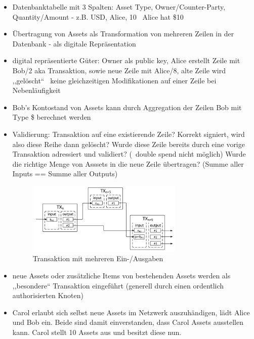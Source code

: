         \begin{itemize}
            \item Datenbanktabelle mit 3 Spalten: Asset Type, Owner/Counter-Party, Quantity/Amount - z.B. USD, Alice, 10 \textrightarrow\ Alice hat \$10
            \item Übertragung von Assets als Transformation von mehreren Zeilen in der Datenbank - als digitale Repräsentation
            \item digital repräsentierte Güter: Owner als public key, Alice erstellt Zeile mit Bob/2 aka Transaktion, sowie neue Zeile mit Alice/8, alte Zeile wird ,,gelöscht`` \textrightarrow\ keine gleichzeitigen Modifikationen auf einer Zeile bei Nebenläufigkeit
            \item Bob's Kontostand von Assets kann durch Aggregation der Zeilen Bob mit Type \$ berechnet werden
            \item Validierung: Transaktion auf eine existierende Zeile? Korrekt signiert, wird also diese Reihe dann gelöscht? Wurde diese Zeile bereits durch eine vorige Transaktion adressiert und validiert? (\textrightarrow\ double spend nicht möglich) Wurde die richtige Menge von Asssets in die neue Zeile übertragen? (Summe aller Inputs == Summe aller Outputs)
            \begin{figure}[H]
                \centering
                \includegraphics[width=0.7\textwidth]{paperNotes/chrisitidis201601.PNG}
                \caption{Transaktion mit mehreren Ein-/Ausgaben}
                \label{figure:txio}
            \end{figure}
            \item neue Assets oder zusätzliche Items von bestehenden Assets werden als ,,besondere`` Transaktion eingeführt (generell durch einen ordentlich authorisierten Knoten)
            \item Carol erlaubt sich selbst neue Assets im Netzwerk auszuhändigen, lädt Alice und Bob ein. Beide sind damit einverstanden, dass Carol Assets ausstellen kann. Carol stellt 10 Assets aus und besitzt diese nun.
        \end{itemize}
        
